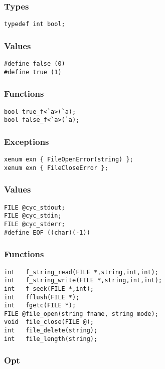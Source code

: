 \subsubsection*{Types}
\begin{verbatim}
typedef int bool;
\end{verbatim}

\subsubsection*{Values}
\begin{verbatim}
#define false (0)
#define true (1)
\end{verbatim}

\subsubsection*{Functions}
\begin{verbatim}
bool true_f<`a>(`a);
bool false_f<`a>(`a);
\end{verbatim}

\subsubsection*{Exceptions}
\begin{verbatim}
xenum exn { FileOpenError(string) };
xenum exn { FileCloseError };
\end{verbatim}

\subsubsection*{Values}
\begin{verbatim}
FILE @cyc_stdout;
FILE @cyc_stdin;
FILE @cyc_stderr;
#define EOF ((char)(-1))
\end{verbatim}

\subsubsection*{Functions}
\begin{verbatim}
int   f_string_read(FILE *,string,int,int);
int   f_string_write(FILE *,string,int,int);
int   f_seek(FILE *,int);
int   fflush(FILE *);
int   fgetc(FILE *);
FILE @file_open(string fname, string mode);
void  file_close(FILE @);
int   file_delete(string);
int   file_length(string);
\end{verbatim}

\subsubsection*{Opt}

